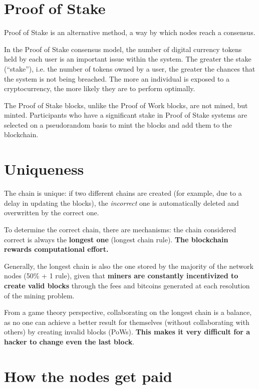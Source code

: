 \section{Proof of Stake}

Proof of Stake is an alternative method, a way by which nodes reach a consensus.

In the Proof of Stake consensus model, the number of digital currency tokens held by each user is an important issue within the system. The greater the stake (``stake''), i.e. the number of tokens owned by a user, the greater the chances that the system is not being breached. The more an individual is exposed to a cryptocurrency, the more likely they are to perform optimally.

The Proof of Stake blocks, unlike the Proof of Work blocks, are not mined, but minted. Participants who have a significant stake in Proof of Stake systems are selected on a pseudorandom basis to mint the blocks and add them to the blockchain.
\section{Uniqueness}

The chain is unique: if two different chains are created (for example, due to a delay in updating the blocks), the \textit{incorrect} one is automatically deleted and overwritten by the correct one.

To determine the correct chain, there are mechanisms: the chain considered correct is always the \textbf{longest one} (longest chain rule). \textbf{The blockchain rewards computational effort.}

Generally, the longest chain is also the one stored by the majority of the network nodes (50\% + 1 rule), given that \textbf{miners are constantly incentivized to create valid blocks} through the fees and bitcoins generated at each resolution of the mining problem. 

From a game theory perspective, collaborating on the longest chain is a balance, as no one can achieve a better result for themselves (without collaborating with others) by creating invalid blocks (PoWs). \textbf{This makes it very difficult for a hacker to change even the last block}.


\section{How the nodes get paid}

